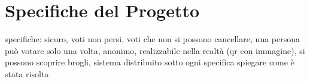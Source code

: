 \chapter*{Specifiche del Progetto}

specifiche: sicuro, voti non persi, voti che non si possono cancellare, una persona può votare solo una volta, anonimo, realizzabile nella realtà (qr con immagine), si possono scoprire brogli, sistema distribuito
sotto ogni specifica spiegare come è stata risolta